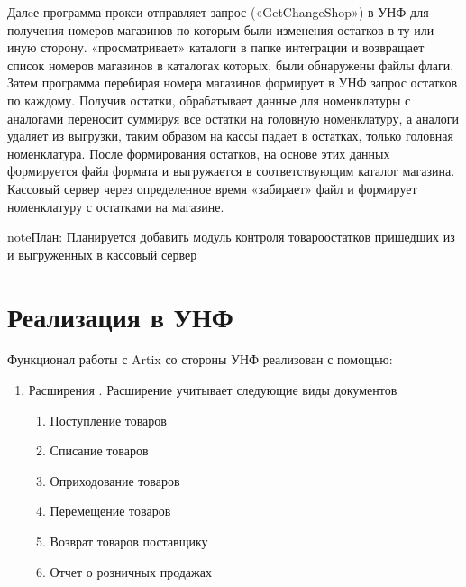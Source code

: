 \documentclass[a4paper,10pt,russian]{report}
\begin{document}
\sphinxAtStartPar
Далeе программа прокси  отправляет запрос («GetChangeShop») в УНФ для получения номеров магазинов по которым были изменения остатков в ту
или иную сторону.  «просматривает» каталоги в папке интеграции и возвращает список номеров магазинов в каталогах которых, были обнаружены
файлы флаги.
Затем программа  перебирая номера магазинов формирует в УНФ запрос остатков по каждому. Получив остатки,  обрабатывает данные \sphinxhyphen{}
для номенклатуры с аналогами переносит суммируя все остатки на головную номенклатуру, а аналоги удаляет из выгрузки, таким образом на кассы падает в остатках, только
головная номенклатура.
После формирования остатков, на основе этих данных формируется файл формата  и выгружается в соответствующим каталог магазина.
Кассовый сервер через определенное время «забирает» файл и формирует номенклатуру с остатками на магазине.

\begin{sphinxadmonition}{note}{\label{\detokenize{description:id2}}План:}
\sphinxAtStartPar
Планируется добавить модуль контроля товаро\sphinxhyphen{}остатков пришедших из  и выгруженных в кассовый сервер
\end{sphinxadmonition}

\sphinxstepscope


\chapter{Реализация в УНФ}
\label{\detokenize{unf:id1}}\label{\detokenize{unf::doc}}
\sphinxAtStartPar
Функционал работы с Artix со стороны УНФ реализован с помощью:
\begin{enumerate}
%
\item {} 
\sphinxAtStartPar
Расширения . Расширение учитывает следующие виды документов
\begin{enumerate}
%
\item {} 
\sphinxAtStartPar
Поступление товаров

\item {} 
\sphinxAtStartPar
Списание товаров

\item {} 
\sphinxAtStartPar
Оприходование товаров

\item {} 
\sphinxAtStartPar
Перемещение товаров

\item {} 
\sphinxAtStartPar
Возврат товаров поставщику

\item {} 
\sphinxAtStartPar
Отчет о розничных продажах

\end{enumerate}

\end{enumerate}
\end{document}
